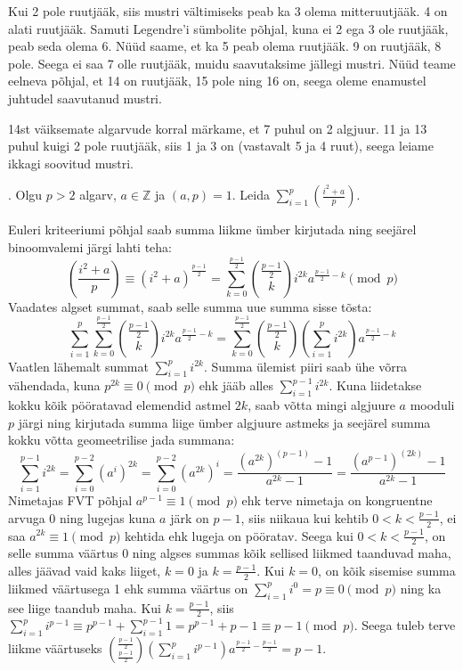 \documentclass[a4paper, 10pt]{article}
\newcommand{\Z}{\mathbb{Z}}
\newcommand{\leg}[2]{\left(\frac{#1}{#2}\right)}
\begin{document}
Kui 2 pole ruutjääk, siis mustri vältimiseks peab ka 3 olema mitteruutjääk. 4 on alati ruutjääk. Samuti Legendre'i sümbolite põhjal, kuna ei 2 ega 3 ole ruutjääk, peab seda olema 6. Nüüd saame, et ka 5 peab olema ruutjääk. 9 on ruutjääk, 8 pole. Seega ei saa 7 olle ruutjääk, muidu saavutaksime jällegi mustri. Nüüd teame eelneva põhjal, et 14 on ruutjääk, 15 pole ning 16 on, seega oleme enamustel juhtudel saavutanud mustri. 

14st väiksemate algarvude korral märkame, et 7 puhul on 2 algjuur. 11 ja 13 puhul kuigi 2 pole ruutjääk, siis 1 ja 3 on (vastavalt 5 ja 4 ruut), seega leiame ikkagi soovitud mustri.
\bigskip


\pagebreak

. Olgu $p>2$ algarv, $a\in\Z$ ja $(a,p) = 1$. Leida $\sum\limits_{i=1}^{p}\left(\frac{i^2+a}{p}\right).$

\bigskip
Euleri kriteeriumi põhjal saab summa liikme ümber kirjutada ning seejärel binoomvalemi järgi lahti teha: $$\leg{i^2+a}p\equiv(i^2+a)^{\frac{p-1}2}=\sum_{k=0}^{\frac{p-1}2}\binom{\frac{p-1}2}{k}i^{2k}a^{\frac{p-1}2-k}\pmod p$$Vaadates algset summat, saab selle summa uue summa sisse tõsta:$$\sum\limits_{i=1}^{p}\sum_{k=0}^{\frac{p-1}2}\binom{\frac{p-1}2}{k}i^{2k}a^{\frac{p-1}2-k}=\sum_{k=0}^{\frac{p-1}2}\binom{\frac{p-1}2}{k}\left(\sum\limits_{i=1}^{p}i^{2k}\right)a^{\frac{p-1}2-k}$$ 
Vaatlen lähemalt summat $\sum_{i=1}^{p}i^{2k}$. Summa ülemist piiri saab ühe võrra vähendada, kuna $p^{2k}\equiv0\pmod p$ ehk jääb alles $\sum_{i=1}^{p-1}i^{2k}$. Kuna liidetakse kokku kõik pööratavad elemendid astmel $2k$, saab võtta mingi algjuure $a$ mooduli $p$ järgi ning kirjutada summa liige ümber algjuure astmeks ja seejärel summa kokku võtta geomeetrilise jada summana: $$\sum_{i=1}^{p-1}i^{2k}=\sum_{i=0}^{p-2}(a^i)^{2k}=\sum_{i=0}^{p-2}(a^{2k})^{i}=\frac{(a^{2k})^{(p-1)}-1}{a^{2k}-1}=\frac{(a^{p-1})^{(2k)}-1}{a^{2k}-1}$$
Nimetajas FVT põhjal $a^{p-1}\equiv1\pmod p$ ehk terve nimetaja on kongruentne arvuga 0 ning lugejas kuna $a$ järk on $p-1$, siis niikaua kui kehtib $0<k<\frac{p-1}2$, ei saa $a^{2k}\equiv1\pmod p$ kehtida ehk lugeja on pööratav. Seega kui $0<k<\frac{p-1}2$, on selle summa väärtus 0 ning algses summas kõik sellised liikmed taanduvad maha, alles jäävad vaid kaks liiget, $k=0$ ja $k=\frac{p-1}2$. Kui $k=0$, on kõik sisemise summa liikmed väärtusega 1 ehk summa väärtus on $\sum_{i=1}^{p}i^{0}=p\equiv0\pmod p$ ning ka see liige taandub maha. Kui $k=\frac{p-1}2$, siis $\sum_{i=1}^{p}i^{p-1}\equiv p^{p-1}+\sum_{i=1}^{p-1}1=p^{p-1}+p-1\equiv p-1\pmod p$. Seega tuleb terve liikme väärtuseks $\binom{\frac{p-1}2}{\frac{p-1}2}\left(\sum\limits_{i=1}^{p}i^{p-1}\right)a^{\frac{p-1}2-\frac{p-1}2}=p-1$.
\end{document}
